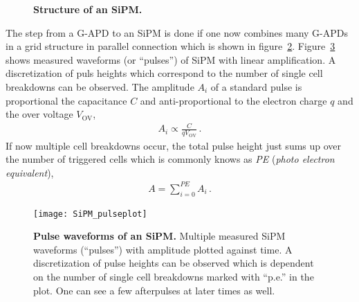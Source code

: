 \begin{figure}[H]
	\centering
	\begin{subfigure}[t]{0.62\textwidth}
		\label{sipm:iceact_sipm}
	\end{subfigure}
	\hfill
	\begin{subfigure}[t]{0.34\textwidth}
		\usebox{\savedimage}
	\end{subfigure}
	\caption[Structure of an SiPM]{\textbf{Structure of an SiPM.} \cite{sipm:datasheet}}
	\label{sipm:circuit_picture}
\end{figure}

The step from a G-APD to an SiPM is done if one now combines many G-APDs in a grid structure in parallel connection which is shown in figure~\ref{sipm:circuit_picture}. Figure~\ref{sipm:pulses} shows measured waveforms (or \enquote{pulses}) of SiPM with linear amplification. A discretization of puls heights which correspond to the number of single cell breakdowns can be observed. The amplitude $A_i$ of a standard pulse is proportional the capacitance $C$ and anti-proportional to the electron charge $q$ and the over voltage $V_\text{OV}$,~\cite{sipm:renker_lorenz}
\begin{align}
	A_i\propto\frac{C}{qV_\text{OV}}\,.
\end{align}
If now multiple cell breakdowns occur, the total pulse height just sums up over the number of triggered cells which is commonly knows as \textit{PE} (\textit{photo electron equivalent}),~\cite{sipm:renker_lorenz}
\begin{align} 
	A = \sum_{i=0}^{PE} A_i\,.
\end{align}

\begin{figure}[H]
	\centering
	\texttt{[image: SiPM\_pulseplot]}
	\caption[Pulse waveforms of an SiPM]{\textbf{Pulse waveforms of an SiPM.} \cite{sipm:hamamatsu_handbook} Multiple measured SiPM waveforms (\enquote{pulses}) with amplitude plotted against time. A discretization of pulse heights can be observed which is dependent on the number of single cell breakdowns marked with \enquote{p.e.} in the plot. One can see a few afterpulses at later times as well.}
	\label{sipm:pulses}
\end{figure}

